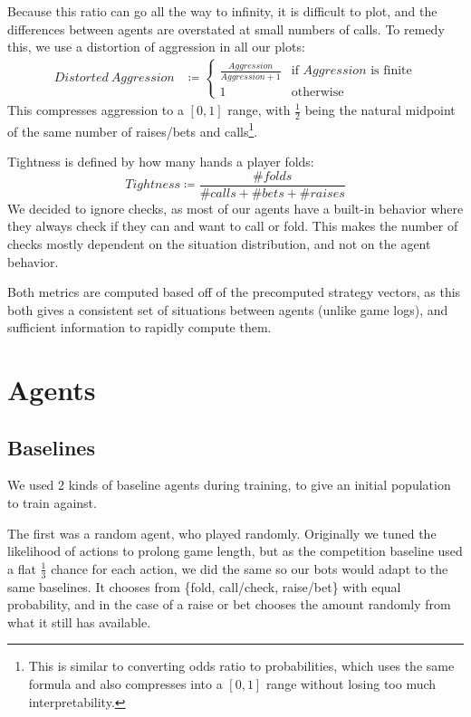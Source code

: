 Because this ratio can go all the way to infinity, it is difficult to plot, and the differences between agents are overstated at small numbers of calls. To remedy this, we use a distortion of aggression in all our plots:
\begin{equation}
\begin{split}
Distorted\ Aggression &\coloneqq \begin{cases}
\frac{Aggression}{Aggression + 1} &\mbox{if }Aggression\mbox{ is finite} \\
1 &\mbox{otherwise}
\end{cases}
\end{split}
\end{equation}
This compresses aggression to a $[0, 1]$ range, with $\frac{1}{2}$ being the natural midpoint of the same number of raises/bets and calls\footnote{This is similar to converting odds ratio to probabilities, which uses the same formula and also compresses into a $[0, 1]$ range without losing too much interpretability.}.

Tightness is defined by how many hands a player folds:
\begin{equation}
    Tightness \coloneqq \frac{\# folds}{\# calls + \# bets + \# raises}
\end{equation}
We decided to ignore checks, as most of our agents have a built-in behavior where they always check if they can and want to call or fold. This makes the number of checks mostly dependent on the situation distribution, and not on the agent behavior.

Both metrics are computed based off of the precomputed strategy vectors, as this both gives a consistent set of situations between agents (unlike game logs), and sufficient information to rapidly compute them.
\section{Agents}

\subsection{Baselines}
We used 2 kinds of baseline agents during training, to give an initial population to train against.

The first was a random agent, who played randomly. Originally we tuned the likelihood of actions to prolong game length, but as the competition baseline used a flat $\frac{1}{3}$ chance for each action, we did the same so our bots would adapt to the same baselines. It chooses from \{fold, call/check, raise/bet\} with equal probability, and in the case of a raise or bet chooses the amount randomly from what it still has available.

